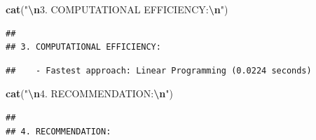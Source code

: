 \documentclass[
]{article}
\newenvironment{Shaded}{\begin{snugshade}}{\end{snugshade}}
\newcommand{\FunctionTok}[1]{\textcolor[rgb]{0.13,0.29,0.53}{\textbf{#1}}}
\newcommand{\NormalTok}[1]{#1}
\newcommand{\OtherTok}[1]{\textcolor[rgb]{0.56,0.35,0.01}{#1}}
\newcommand{\SpecialCharTok}[1]{\textcolor[rgb]{0.81,0.36,0.00}{\textbf{#1}}}
\newcommand{\StringTok}[1]{\textcolor[rgb]{0.31,0.60,0.02}{#1}}
\begin{document}
\begin{Shaded}
\begin{Highlighting}[]
\FunctionTok{cat}\NormalTok{(}\StringTok{"}\SpecialCharTok{\textbackslash{}n}\StringTok{3. COMPUTATIONAL EFFICIENCY:}\SpecialCharTok{\textbackslash{}n}\StringTok{"}\NormalTok{)}
\end{Highlighting}
\end{Shaded}

\begin{verbatim}
## 
## 3. COMPUTATIONAL EFFICIENCY:
\end{verbatim}

\begin{Shaded}
\end{Shaded}

\begin{verbatim}
##    - Fastest approach: Linear Programming (0.0224 seconds)
\end{verbatim}

\begin{Shaded}
\begin{Highlighting}[]
\FunctionTok{cat}\NormalTok{(}\StringTok{"}\SpecialCharTok{\textbackslash{}n}\StringTok{4. RECOMMENDATION:}\SpecialCharTok{\textbackslash{}n}\StringTok{"}\NormalTok{)}
\end{Highlighting}
\end{Shaded}

\begin{verbatim}
## 
## 4. RECOMMENDATION:
\end{verbatim}
\end{document}
